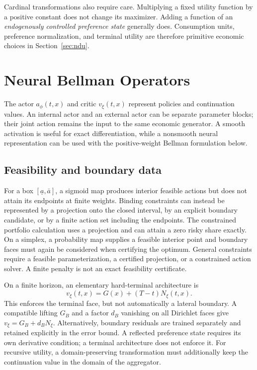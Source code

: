 \documentclass[ecta,nameyear,draft]{econsocart}
\theoremstyle{definition}
\theoremstyle{remark}
\begin{document}
Cardinal transformations also require care. Multiplying a fixed utility function by a positive constant does not change its maximizer. Adding a function of an \emph{endogenously controlled preference state} generally does. Consumption units, preference normalization, and terminal utility are therefore primitive economic choices in Section~\ref{sec:ndu}.

\section{Neural Bellman Operators}\label{sec:method}
The actor $a_\phi(t,x)$ and critic $v_\xi(t,x)$ represent policies and continuation values. An internal actor and an external actor can be separate parameter blocks; their joint action remains the input to the same economic generator. A smooth activation is useful for exact differentiation, while a nonsmooth neural representation can be used with the positive-weight Bellman formulation below.

\subsection{Feasibility and boundary data}
For a box $[\underline a,\bar a]$, a sigmoid map produces interior feasible actions but does not attain its endpoints at finite weights. Binding constraints can instead be represented by a projection onto the closed interval, by an explicit boundary candidate, or by a finite action set including the endpoints. The constrained portfolio calculation uses a projection and can attain a zero risky share exactly. On a simplex, a probability map supplies a feasible interior point and boundary faces must again be considered when certifying the optimum. General constraints require a feasible parameterization, a certified projection, or a constrained action solver. A finite penalty is not an exact feasibility certificate.

On a finite horizon, an elementary hard-terminal architecture is
\begin{equation}\label{eq:terminal}
 v_\xi(t,x)=G(x)+(T-t)N_\xi(t,x).
\end{equation}
This enforces the terminal face, but not automatically a lateral boundary. A compatible lifting $G_B$ and a factor $d_B$ vanishing on all Dirichlet faces give $v_\xi=G_B+d_BN_\xi$. Alternatively, boundary residuals are trained separately and retained explicitly in the error bound. A reflected preference state requires its own derivative condition; a terminal architecture does not enforce it. For recursive utility, a domain-preserving transformation must additionally keep the continuation value in the domain of the aggregator.
\end{document}
